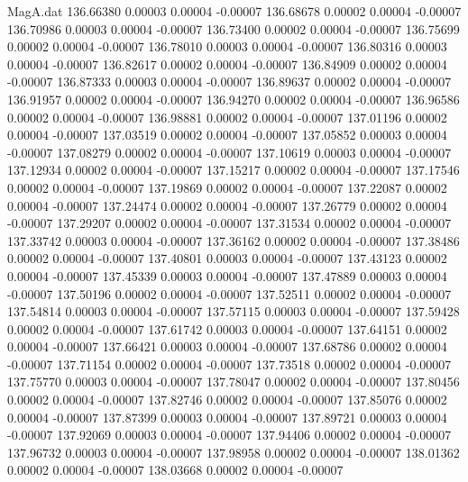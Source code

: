 \begin{filecontents}{MagA.dat}
 136.66380    0.00003    0.00004   -0.00007
 136.68678    0.00002    0.00004   -0.00007
 136.70986    0.00003    0.00004   -0.00007
 136.73400    0.00002    0.00004   -0.00007
 136.75699    0.00002    0.00004   -0.00007
 136.78010    0.00003    0.00004   -0.00007
 136.80316    0.00003    0.00004   -0.00007
 136.82617    0.00002    0.00004   -0.00007
 136.84909    0.00002    0.00004   -0.00007
 136.87333    0.00003    0.00004   -0.00007
 136.89637    0.00002    0.00004   -0.00007
 136.91957    0.00002    0.00004   -0.00007
 136.94270    0.00002    0.00004   -0.00007
 136.96586    0.00002    0.00004   -0.00007
 136.98881    0.00002    0.00004   -0.00007
 137.01196    0.00002    0.00004   -0.00007
 137.03519    0.00002    0.00004   -0.00007
 137.05852    0.00003    0.00004   -0.00007
 137.08279    0.00002    0.00004   -0.00007
 137.10619    0.00003    0.00004   -0.00007
 137.12934    0.00002    0.00004   -0.00007
 137.15217    0.00002    0.00004   -0.00007
 137.17546    0.00002    0.00004   -0.00007
 137.19869    0.00002    0.00004   -0.00007
 137.22087    0.00002    0.00004   -0.00007
 137.24474    0.00002    0.00004   -0.00007
 137.26779    0.00002    0.00004   -0.00007
 137.29207    0.00002    0.00004   -0.00007
 137.31534    0.00002    0.00004   -0.00007
 137.33742    0.00003    0.00004   -0.00007
 137.36162    0.00002    0.00004   -0.00007
 137.38486    0.00002    0.00004   -0.00007
 137.40801    0.00003    0.00004   -0.00007
 137.43123    0.00002    0.00004   -0.00007
 137.45339    0.00003    0.00004   -0.00007
 137.47889    0.00003    0.00004   -0.00007
 137.50196    0.00002    0.00004   -0.00007
 137.52511    0.00002    0.00004   -0.00007
 137.54814    0.00003    0.00004   -0.00007
 137.57115    0.00003    0.00004   -0.00007
 137.59428    0.00002    0.00004   -0.00007
 137.61742    0.00003    0.00004   -0.00007
 137.64151    0.00002    0.00004   -0.00007
 137.66421    0.00003    0.00004   -0.00007
 137.68786    0.00002    0.00004   -0.00007
 137.71154    0.00002    0.00004   -0.00007
 137.73518    0.00002    0.00004   -0.00007
 137.75770    0.00003    0.00004   -0.00007
 137.78047    0.00002    0.00004   -0.00007
 137.80456    0.00002    0.00004   -0.00007
 137.82746    0.00002    0.00004   -0.00007
 137.85076    0.00002    0.00004   -0.00007
 137.87399    0.00003    0.00004   -0.00007
 137.89721    0.00003    0.00004   -0.00007
 137.92069    0.00003    0.00004   -0.00007
 137.94406    0.00002    0.00004   -0.00007
 137.96732    0.00003    0.00004   -0.00007
 137.98958    0.00002    0.00004   -0.00007
 138.01362    0.00002    0.00004   -0.00007
 138.03668    0.00002    0.00004   -0.00007

\end{filecontents}
